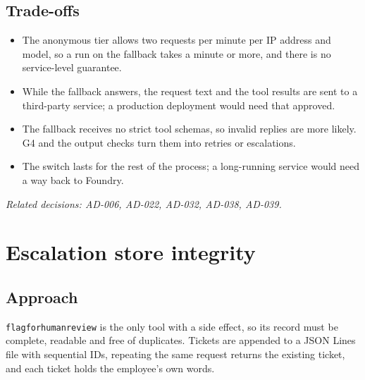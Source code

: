 \documentclass[11pt,letterpaper]{article}
\renewcommand{\_}{\textunderscore\allowbreak}
\begin{document}
\subsection*{Trade-offs}
\begin{itemize}
  \item The anonymous tier allows two requests per minute per IP address and model, so a run on
  the fallback takes a minute or more, and there is no service-level guarantee.
  \item While the fallback answers, the request text and the tool results are sent to a
  third-party service; a production deployment would need that approved.
  \item The fallback receives no strict tool schemas, so invalid replies are more likely. G4 and
  the output checks turn them into retries or escalations.
  \item The switch lasts for the rest of the process; a long-running service would need a way
  back to Foundry.
\end{itemize}

{\small\textit{Related decisions: AD-006, AD-022, AD-032, AD-038, AD-039.}}

\section{Escalation store integrity}

\subsection*{Approach}
\texttt{flag\_for\_human\_review} is the only tool with a side effect, so its record must be
complete, readable and free of duplicates. Tickets are appended to a JSON Lines file with
sequential IDs, repeating the same request returns the existing ticket, and each ticket holds the
employee's own words.
\end{document}
